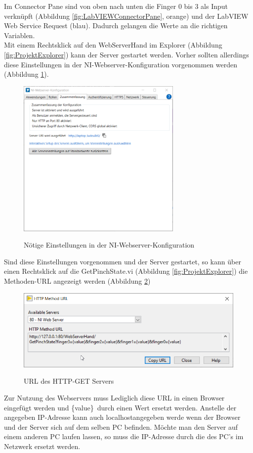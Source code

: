 \documentclass[a4paper,12pt,final]{article} %
\numberwithin{equation}{section} %
\numberwithin{figure}{section} %
\numberwithin{table}{section} %
\begin{document}
Im Connector Pane sind von oben nach unten die Finger 0 bis 3 als Input verknüpft (Abbildung \ref{fig:LabVIEWConnectorPane}, orange) und der LabVIEW Web Service Request (blau). 
Dadurch gelangen die Werte an die richtigen Variablen.\\
Mit einem Rechtsklick auf den WebServerHand im Explorer (Abbildung \ref{fig:ProjektExplorer}) kann der Server gestartet werden. Vorher sollten allerdings diese Einstellungen in der NI-Webserver-Konfiguration vorgenommen werden (Abbildung \ref{fig:EinstellungenWebServer}).
\begin{figure}[H]
	\begin{center}
		\includegraphics[width=8cm]{Bilder/Einstellungen-StartServerNeu.png}
		\label{fig:EinstellungenWebServer}
		\caption{Nötige Einstellungen in der NI-Webserver-Konfiguration}
	\end{center}
\end{figure}
Sind diese Einstellungen vorgenommen und der Server gestartet, so kann über einen Rechtsklick auf die GetPinchState.vi (Abbildung \ref{fig:ProjektExplorer}) die Methoden-URL angezeigt werden (Abbildung \ref{fig:HTTPMethod})
\begin{figure}[H]
	\begin{center}
		\includegraphics[width=12cm]{Bilder/HTTPMethod.png}
		\label{fig:HTTPMethod}
		\caption{URL des HTTP-GET Servers}
	\end{center}
\end{figure}
Zur Nutzung des Webservers muss Lediglich diese URL in einen Browser eingefügt werden und \glqq \{value\}\grqq\ durch einen Wert ersetzt werden.
Anstelle der angegeben IP-Adresse kann auch \glqq localhost\grqq angegeben werde wenn der Browser und der Server sich auf dem selben PC befinden.
Möchte man den Server auf einem anderen PC laufen lassen, so muss die IP-Adresse durch die des PC's im Netzwerk ersetzt werden.
\end{document}
